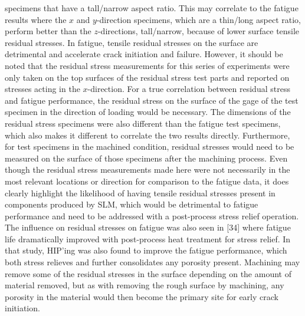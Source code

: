 \documentclass[10pt]{article}
\begin{document}
specimens that have a tall/narrow aspect ratio. This may correlate to the fatigue results where the $x$ and $y$-direction specimens, which are a thin/long aspect ratio, perform better than the $z$-directions, tall/narrow, because of lower surface tensile residual stresses. In fatigue, tensile residual stresses on the surface are detrimental and accelerate crack initiation and failure. However, it should be noted that the residual stress measurements for this series of experiments were only taken on the top surfaces of the residual stress test parts and reported on stresses acting in the $x$-direction. For a true correlation between residual stress and fatigue performance, the residual stress on the surface of the gage of the test specimen in the direction of loading would be necessary. The dimensions of the residual stress specimens were also different than the fatigue test specimens, which also makes it different to correlate the two results directly. Furthermore, for test specimens in the machined condition, residual stresses would need to be measured on the surface of those specimens after the machining process. Even though the residual stress measurements made here were not necessarily in the most relevant locations or direction for comparison to the fatigue data, it does clearly highlight the likelihood of having tensile residual stresses present in components produced by SLM, which would be detrimental to fatigue performance and need to be addressed with a post-process stress relief operation. The influence on residual stresses on fatigue was also seen in [34] where fatigue life dramatically improved with post-process heat treatment for stress relief. In that study, HIP'ing was also found to improve the fatigue performance, which both stress relieves and further consolidates any porosity present. Machining may remove some of the residual stresses in the surface depending on the amount of material removed, but as with removing the rough surface by machining, any porosity in the material would then become the primary site for early crack initiation.
\end{document}
